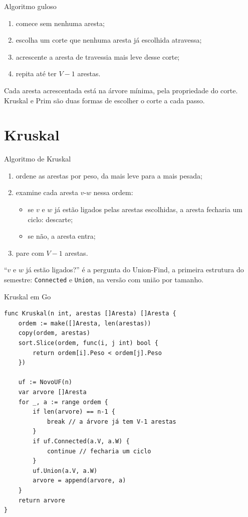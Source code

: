 \documentclass{beamer}
\begin{document}
\begin{frame}{Algoritmo guloso}
	\begin{enumerate}
		\item comece sem nenhuma aresta;
		\item escolha um corte que nenhuma aresta já escolhida atravessa;
		\item acrescente a aresta de travessia mais leve desse corte;
		\item repita até ter $V - 1$ arestas.
	\end{enumerate}

	\vspace{0.3cm}
	Cada aresta acrescentada está na árvore mínima, pela propriedade do corte.
	Kruskal e Prim são duas formas de escolher o corte a cada passo.
\end{frame}

\section{Kruskal}

\begin{frame}{Algoritmo de Kruskal}
	\begin{enumerate}
		\item ordene as arestas por peso, da mais leve para a mais pesada;
		\item examine cada aresta $v$-$w$ nessa ordem:
		      \begin{itemize}
			      \item se $v$ e $w$ já estão ligados pelas arestas escolhidas, a
			            aresta fecharia um ciclo: descarte;
			      \item se não, a aresta entra;
		      \end{itemize}
		\item pare com $V - 1$ arestas.
	\end{enumerate}

	\vspace{0.3cm}
	``$v$ e $w$ já estão ligados?'' é a pergunta do Union-Find, a primeira
	estrutura do semestre: \texttt{Connected} e \texttt{Union}, na versão com
	união por tamanho.
\end{frame}

\begin{frame}[fragile]{Kruskal em Go}
	\begin{verbatim}
func Kruskal(n int, arestas []Aresta) []Aresta {
	ordem := make([]Aresta, len(arestas))
	copy(ordem, arestas)
	sort.Slice(ordem, func(i, j int) bool {
		return ordem[i].Peso < ordem[j].Peso
	})

	uf := NovoUF(n)
	var arvore []Aresta
	for _, a := range ordem {
		if len(arvore) == n-1 {
			break // a árvore já tem V-1 arestas
		}
		if uf.Connected(a.V, a.W) {
			continue // fecharia um ciclo
		}
		uf.Union(a.V, a.W)
		arvore = append(arvore, a)
	}
	return arvore
}
\end{verbatim}
\end{frame}
\end{document}
